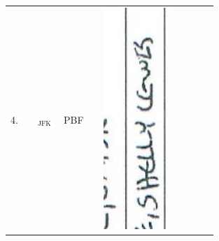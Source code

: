 \documentclass[10pt]{article}
\begin{document}
\begin{center}
\begin{tabular}{|c|c|c|c|c|c|c|c|c|c|}
 &  &  &  &  \\
\hline
4. &  & \({ }_{\text {JFK }}\) & PBF &  & \includegraphics[max width=\textwidth]{2025_02_27_dd68c3d38de88f0516d9g-096(3)}

\end{tabular}
\end{center}
\end{document}
